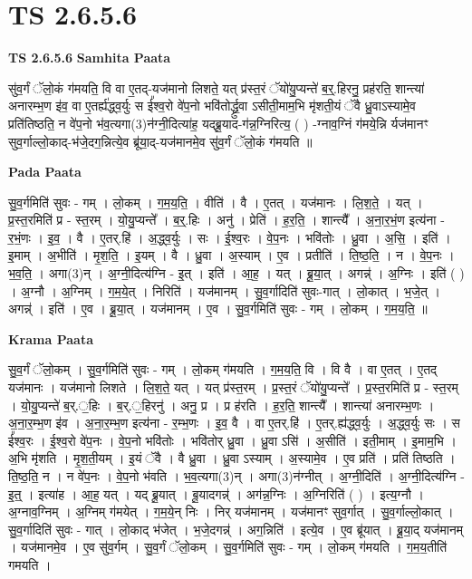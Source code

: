 \documentclass[17pt]{extarticle}
\begin{document}
\section{ TS 2.6.5.6 }

\textbf{TS 2.6.5.6 } \newline
\textbf{Samhita Paata} \newline

सु॑व॒र्गं ॅलो॒कं ग॑मयति॒ वि वा ए॒तद्-यज॑मानो लिशते॒ यत् प्र॑स्त॒रं ॅयो॑यु॒प्यन्ते॑ ब॒र्॒.हिरनु॒ प्रह॑रति॒ शान्त्या॑ अनारम्भ॒ण इ॑व॒ वा ए॒तर्ह्य॑द्ध्व॒र्युः स ई᳚श्व॒रो वे॑प॒नो भवि॑तोर्द्ध्रु॒वा ऽसीती॒माम॒भि मृ॑शती॒यं ॅवै ध्रु॒वाऽस्यामे॒व प्रति॑तिष्ठति॒ न वे॑प॒नो भ॑व॒त्यगा(3)न॑ग्नी॒दित्या॑ह॒ यद्ब्रू॒याद-ग॑न्न॒ग्निरित्य॒ ( ) -ग्नाव॒ग्निं ग॑मये॒न्नि र्यज॑मानꣳ सुव॒र्गाल्लो॒काद्-भ॑जे॒दग॒न्नित्ये॒व ब्रू॑या॒द्-यज॑मानमे॒व सु॑व॒र्गं ॅलो॒कं ग॑मयति ॥ \newline

\textbf{Pada Paata} \newline

सु॒व॒र्गमिति॑ सुवः - गम् । लो॒कम् । ग॒म॒य॒ति॒ । वीति॑ । वै । ए॒तत् । यज॑मानः । लि॒श॒ते॒ । यत् । प्र॒स्त॒रमिति॑ प्र - स्त॒रम् । यो॒यु॒प्यन्ते᳚ । ब॒र्॒.हिः । अनु॑ । प्रेति॑ । ह॒र॒ति॒ । शान्त्यै᳚ । अ॒ना॒र॒भं॒ण इत्य॑ना - र॒भं॒णः । इ॒व॒ । वै । ए॒तर्.हि॑ । अ॒द्ध्व॒र्युः । सः । ई॒श्व॒रः । वे॒प॒नः । भवि॑तोः । ध्रु॒वा । अ॒सि॒ । इति॑ । इ॒माम् । अ॒भीति॑ । मृ॒श॒ति॒ । इ॒यम् । वै । ध्रु॒वा । अ॒स्याम् । ए॒व । प्रतीति॑ । ति॒ष्ठ॒ति॒ । न । वे॒प॒नः । भ॒व॒ति॒ । अगा(3)न् । अ॒ग्नी॒दित्य॑ग्नि - इ॒त् । इति॑ । आ॒ह॒ । यत् । ब्रू॒या॒त् । अगन्न्॑ । अ॒ग्निः । इति॑ ( ) । अ॒ग्नौ । अ॒ग्निम् । ग॒म॒ये॒त् । निरिति॑ । यज॑मानम् । सु॒व॒र्गादिति॑ सुवः-गात् । लो॒कात् । भ॒जे॒त् । अगन्न्॑ । इति॑ । ए॒व । ब्रू॒या॒त् । यज॑मानम् । ए॒व । सु॒व॒र्गमिति॑ सुवः - गम् । लो॒कम् । ग॒म॒य॒ति॒ ॥  \newline


\textbf{Krama Paata} \newline

सु॒व॒र्गं ॅलो॒कम् । सु॒व॒र्गमिति॑ सुवः - गम् । लो॒कम् ग॑मयति । ग॒म॒य॒ति॒ वि । वि वै । वा ए॒तत् । ए॒तद् यज॑मानः । यज॑मानो लिशते । लि॒श॒ते॒ यत् । यत् प्र॑स्त॒रम् । प्र॒स्त॒रं ॅयो॑यु॒प्यन्ते᳚ । प्र॒स्त॒रमिति॑ प्र - स्त॒रम् । यो॒यु॒प्यन्ते॑ ब॒र्.॒हिः । ब॒र्.॒हिरनु॑ । अनु॒ प्र । प्र ह॑रति । ह॒र॒ति॒ शान्त्यै᳚ । शान्त्या॑ अनारम्भ॒णः । अ॒ना॒र॒म्भ॒ण इ॑व । अ॒ना॒र॒म्भ॒ण इत्य॑ना - र॒म्भ॒णः । इ॒व॒ वै । वा ए॒तर्.हि॑ । ए॒तर्.ह्य॑द्ध्व॒र्युः । अ॒द्ध्व॒र्युः सः । स ई᳚श्व॒रः । ई॒श्व॒रो वे॑प॒नः । वे॒प॒नो भवि॑तोः । भवि॑तोर् ध्रु॒वा । ध्रु॒वा ऽसि॑ । अ॒सीति॑ । इती॒माम् । इ॒माम॒भि । अ॒भि मृ॑शति । मृ॒श॒ती॒यम् । इ॒यं ॅवै । वै ध्रु॒वा । ध्रु॒वा ऽस्याम् । अ॒स्यामे॒व । ए॒व प्रति॑ । प्रति॑ तिष्ठति । ति॒ष्ठ॒ति॒ न । न वे॑प॒नः । वे॒प॒नो भ॑वति । भ॒व॒त्यगा(3)न् । अगा(3)न॑ग्नीत् । अ॒ग्नी॒दिति॑ । अ॒ग्नी॒दित्य॑ग्नि - इ॒त्॒ । इत्या॑ह । आ॒ह॒ यत् । यद् ब्रू॒यात् । बू॒यादगन्न्॑ । अग॑न्न॒ग्निः । अ॒ग्निरिति॑ ( ) । इत्य॒ग्नौ । अ॒ग्नाव॒ग्निम् । अ॒ग्निम् ग॑मयेत् । ग॒म॒ये॒न् निः । निर् यज॑मानम् । यज॑मानꣳ सुव॒र्गात् । सु॒व॒र्गाल्लो॒कात् । सु॒व॒र्गादिति॑ सुवः - गात् । लो॒काद् भ॑जेत् । भ॒जे॒दगन्न्॑ । अग॒न्निति॑ । इत्ये॒व । ए॒व ब्रू॑यात् । ब्रू॒या॒द् यज॑मानम् । यज॑मानमे॒व । ए॒व सु॑व॒र्गम् । सु॒व॒र्गं ॅलो॒कम् । सु॒व॒र्गमिति॑ सुवः - गम् । लो॒कम् ग॑मयति । ग॒म॒य॒तीति॑ गमयति । \newline
\end{document}

